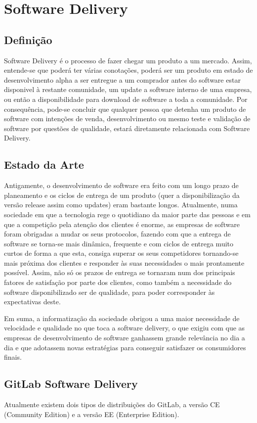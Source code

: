 \documentclass[12pt,a4paper]{article}
\begin{document}
\section{Software Delivery}
\subsection{Definição}
Software Delivery é o processo de fazer chegar um produto a um mercado. Assim, entende-se que poderá ter várias conotações, poderá ser um produto em estado de desenvolvimento alpha a ser entregue a um comprador antes do software estar disponivel à restante comunidade, um update a software interno de uma empresa, ou então a disponibilidade para download de software a toda a comunidade.
Por consequência, pode-se concluir que qualquer pessoa que detenha um produto de software com intenções de venda, desenvolvimento ou mesmo teste e validação de software por questões de qualidade, estará diretamente relacionada com Software Delivery.

\subsection{Estado da Arte}
Antigamente, o desenvolvimento de software era feito com um longo prazo de planeamento e os ciclos de entrega de um produto (quer a disponibilização da versão release assim como updates) eram bastante longos. Atualmente, numa sociedade em que a tecnologia rege o quotidiano da maior parte das pessoas e em que a competição pela atenção dos clientes é enorme, as empresas de software foram obrigadas a mudar os seus protocolos, fazendo com que a entrega de software se torna-se mais dinâmica, frequente e com ciclos de entrega muito curtos de forma a que esta, consiga superar os seus competidores tornando-se mais próxima dos clientes e responder às suas necessidades o mais prontamente possível. Assim, não só os prazos de entrega se tornaram num dos principais fatores de satisfação por parte dos clientes, como também a necessidade do software disponibilizado ser de qualidade, para poder corresponder às expectativas deste.
\par Em suma, a informatização da sociedade obrigou a uma maior necessidade de velocidade e qualidade no que toca a software delivery, o que exigiu com que as empresas de desenvolvimento de software ganhassem grande relevância no dia a dia e que adotassem novas estratégias para conseguir satisfazer os consumidores finais. 

\subsection{GitLab Software Delivery}
Atualmente existem dois tipos de distribuições do GitLab, a versão CE (Community Edition) e a versão EE (Enterprise Edition). 
\end{document}
